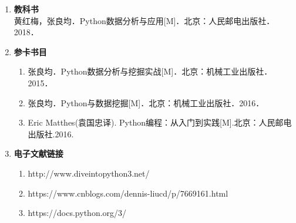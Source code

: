 \documentclass[12pt,a4paper,openany,cap]{ctexbook}
\begin{document}
\begin{enumerate}
\item \textbf{教科书}\\  黄红梅，张良均．Python数据分析与应用[M]．北京：人民邮电出版社．2018．
\item \textbf{参卡书目}
  \begin{enumerate}
 \item\label{item:70}    张良均．Python数据分析与挖掘实战[M]．北京：机械工业出版社．2015．
\item\label{item:1} 	张良均．Python与数据挖掘[M]．北京：机械工业出版社．2016．
\item\label{item:25}  Eric Matthes(袁国忠译). Python编程：从入门到实践[M].北京：人民邮电出版社.2016.
\end{enumerate}
\item\label{item:20}\textbf{电子文献链接}\\
  \begin{enumerate}
  \item http://www.diveintopython3.net/
\item\label{item:2} https://www.cnblogs.com/dennis-liucd/p/7669161.html
\item\label{item:3} https://docs.python.org/3/
  \end{enumerate}
\end{enumerate}
\end{document}
